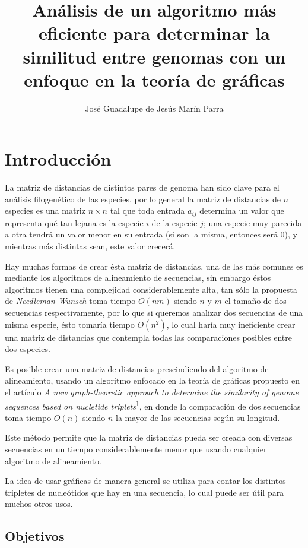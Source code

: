 \documentclass[12pt]{article}
\title{Análisis de un algoritmo más eficiente para determinar la similitud entre genomas con un enfoque en la teoría de gráficas}
\author{José Guadalupe de Jesús Marín Parra}
\begin{document}

\maketitle

\section{Introducción}

\noindent La matriz de distancias de distintos pares de genoma han sido clave para el análisis filogenético de las especies, por lo general la matriz de distancias de $n$ especies es una matriz $n\times n$ tal que toda entrada $a_{ij}$ determina un valor que representa qué tan lejana es la especie $i$ de la especie $j$; una especie muy parecida a otra tendrá un valor menor en su entrada (si son la misma, entonces será 0), y mientras más distintas sean, este valor crecerá.

Hay muchas formas de crear ésta matriz de distancias, una de las más comunes es mediante los algoritmos de alineamiento de secuencias, sin embargo éstos algoritmos tienen una complejidad considerablemente alta, tan sólo la propuesta de \textit{Needleman-Wunsch} toma tiempo $O(nm)$ siendo $n$ y $m$ el tamaño de dos secuencias respectivamente, por lo que si queremos analizar dos secuencias de una misma especie, ésto tomaría tiempo $O(n^2)$, lo cual haría muy ineficiente crear una matriz de distancias que contempla todas las comparaciones posibles entre dos especies.

Es posible crear una matriz de distancias prescindiendo del algoritmo de alineamiento, usando un algoritmo enfocado en la teoría de gráficas propuesto en el artículo \textit{A new graph-theoretic approach to determine the similarity of genome sequences based on nucletide triplets}\textsuperscript{1}, en donde la comparación de dos secuencias toma tiempo $O(n)$ siendo $n$ la mayor de las secuencias según su longitud.

Este método permite que la matriz de distancias pueda ser creada con diversas secuencias en un tiempo considerablemente menor que usando cualquier algoritmo de alineamiento.

La idea de usar gráficas de manera general se utiliza para contar los distintos tripletes de nucleótidos que hay en una secuencia, lo cual puede ser útil para muchos otros usos.

\subsection{Objetivos}
\end{document}
